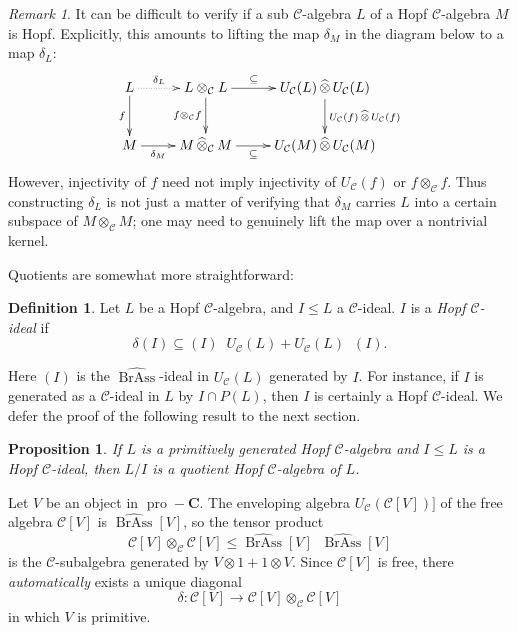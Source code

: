 \documentclass[12pt]{article}
\DeclareMathOperator{\pro}{pro}
\DeclareMathOperator{\BrAss}{BrAss}
\DeclareMathOperator{\hattimes}{\widehat{\otimes}}
\newcommand{\BrAsshat}{\widehat{\BrAss}} %
\newcommand{\CC} {\mathcal{C}}
\newcommand{\bC} {\mathbf{C}}
\newcommand{\proC}{\pro\!-\bC}
\theoremstyle{plain}
\newtheorem{prop}[thm]{Proposition}
\theoremstyle{definition}
\newtheorem{defn}[thm]{Definition}
\theoremstyle{remark}
\newtheorem{rem}[thm]{Remark}
\begin{document}
\begin{rem} It can be difficult to verify if a sub $\CC$-algebra $L$ of a Hopf $\CC$-algebra $M$ is Hopf.  Explicitly, this amounts to lifting the map $\delta_M$ in the diagram below to a map $\delta_L$:
%
$$\xymatrix{
L \ar[d]_-{f} \ar@.[r]^-{\delta_L} & L \otimes_{\CC} L \ar[d]_-{f \otimes_{\CC} f} \ar[r]^-{\subseteq} & U_{\CC}(L) \hattimes U_{\CC}(L) \ar[d]^-{U_{\CC}(f) \hattimes U_{\CC}(f)} \\
M \ar[r]_-{\delta_M} & M \hattimes_{\CC} M \ar[r]_-{\subseteq} & U_{\CC}(M) \hattimes U_{\CC}(M)  \\
}$$
%
However, injectivity of $f$ need not imply injectivity of $U_{\CC}(f)$ or $f \otimes_{\CC} f$.  Thus constructing $\delta_L$ is not just a matter of verifying that $\delta_M$ carries $L$ into a certain subspace of $M \otimes_{\CC} M$; one may need to genuinely lift the map over a nontrivial kernel.

\end{rem}

Quotients are somewhat more straightforward:

\begin{defn} 

Let $L$ be a Hopf $\CC$-algebra, and $I \leq L$ a $\CC$-ideal.  $I$ is a \emph{Hopf $\CC$-ideal} if 
%
$$\delta(I) \subseteq (I) \hattimes U_{\CC}(L) + U_{\CC}(L) \hattimes (I).$$

\end{defn}

Here $(I)$ is the $\BrAsshat$-ideal in $U_{\CC}(L)$ generated by $I$.  For instance, if $I$ is generated as a $\CC$-ideal in $L$ by $I \cap P(L)$, then $I$ is certainly a Hopf $\CC$-ideal.  We defer the proof of the following result to the next section.

\begin{prop} \label{quotient_hopf_prop} If $L$ is a primitively generated Hopf $\CC$-algebra and $I \leq L$ is a Hopf $\CC$-ideal, then $L/I$ is a quotient Hopf $\CC$-algebra of $L$. \end{prop}

Let $V$ be an object in $\proC$.  The enveloping algebra $U_{\CC}(\CC[V])]$ of the free algebra $\CC[V]$ is $\BrAsshat[V]$, so the tensor product
%
$$\CC[V] \otimes_{\CC} \CC[V] \leq \BrAsshat[V] \hattimes \BrAsshat[V]$$
%
is the $\CC$-subalgebra generated by $V \otimes 1 + 1 \otimes V$.  Since $\CC[V]$ is free, there \emph{automatically} exists a unique diagonal 
%
$$\delta: \CC[V] \to \CC[V] \otimes_{\CC} \CC[V]$$
%
in which $V$ is primitive.
\end{document}
